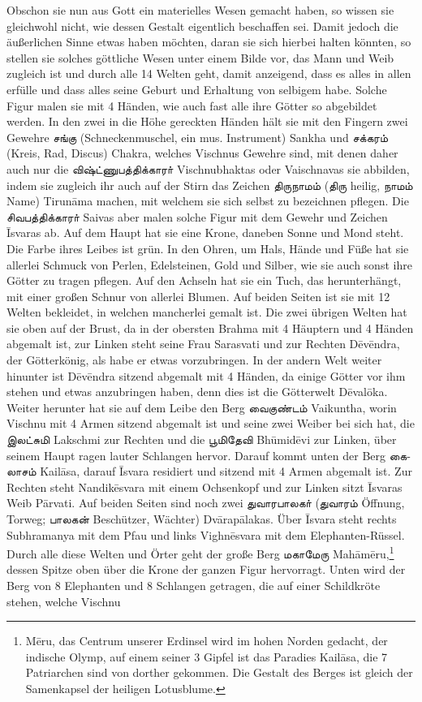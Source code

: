 \documentclass{article}
\newcommand{\TamilText}[1]{\texttamil{#1}}
\newcommand{\tam}[1]{\TamilText{#1}}
\begin{document}
Obschon sie nun aus Gott ein materielles Wesen gemacht haben, so wissen sie gleichwohl nicht, wie dessen Gestalt eigentlich beschaffen sei. Damit jedoch die äußerlichen Sinne etwas haben möchten, daran sie sich hierbei halten könnten, so stellen sie solches göttliche Wesen unter einem Bilde vor, das Mann und Weib zugleich ist und durch alle 14 Welten geht, damit anzeigend, dass es alles in allen erfülle und dass alles seine Geburt und Erhaltung von selbigem habe. Solche Figur malen sie mit 4 Händen, wie auch fast alle ihre Götter so abgebildet werden. In den zwei in die Höhe gereckten Händen hält sie mit den Fingern zwei Gewehre \tam{சங்கு} (Schneckenmuschel, ein mus. Instrument) Sankha und \tam{சக்கரம்} (Kreis, Rad, Discus) Chakra, welches Vischnus Gewehre sind, mit denen daher auch nur die \tam{விஷ்ட்ணுபத்திக்காரா்} Vischnubhaktas oder Vaischnavas sie abbilden, indem sie zugleich ihr auch auf der Stirn das Zeichen \tam{திருநாமம்} (\tam{திரு} heilig, \tam{நாமம்} Name) Tirun\={a}ma machen, mit welchem sie sich selbst zu bezeichnen pflegen. Die \tam{சிவபத்திக்காரா்} Saivas aber malen solche Figur mit dem Gewehr und Zeichen \={I}svaras ab. Auf dem Haupt hat sie eine Krone, daneben Sonne und Mond steht. Die Farbe ihres Leibes ist grün. In den Ohren, um Hals, Hände und Füße hat sie allerlei Schmuck von Perlen, Edelsteinen, Gold und Silber, wie sie auch sonst ihre Götter zu tragen pflegen. Auf den Achseln hat sie ein Tuch, das herunterhängt, mit einer großen Schnur von allerlei Blumen. Auf beiden Seiten ist sie mit 12 Welten bekleidet, in welchen mancherlei gemalt ist. Die zwei übrigen Welten hat sie oben auf der Brust, da in der obersten Brahma mit 4 Häuptern und 4 Händen abgemalt ist, zur Linken steht seine Frau Sarasvati und zur Rechten D\={e}v\={e}ndra, der Götterkönig, als habe er etwas vorzubringen. In der andern Welt weiter hinunter ist D\={e}v\={e}ndra sitzend abgemalt mit 4 Händen, da einige Götter vor ihm stehen und etwas anzubringen haben, denn dies ist die Götterwelt D\={e}val\={o}ka. Weiter herunter hat sie auf dem Leibe den Berg \tam{வைகுண்டம்} Vaikuntha, worin Vischnu mit 4 Armen sitzend abgemalt ist und seine zwei Weiber bei sich hat, die \tam{இலட்சுமி} Lakschmi zur Rechten und die \tam{பூமிதேவி} Bh\={u}mid\={e}vi zur Linken, über seinem Haupt ragen lauter Schlangen hervor. Darauf kommt unten der Berg \tam{கைலாசம்} Kail\={a}sa, darauf \={I}svara residiert und sitzend mit 4 Armen abgemalt ist. Zur Rechten steht Nandik\={e}svara mit einem Ochsenkopf und zur Linken sitzt \={I}svaras Weib P\={a}rvati. Auf beiden Seiten sind noch zwei \tam{துவாரபாலகா்} (\tam{துவாரம்} Öffnung, Torweg; \tam{பாலகன்} Beschützer, Wächter) Dv\={a}rap\={a}lakas. Über \={I}svara steht rechts Subhramanya mit dem Pfau und links Vighn\={e}svara mit dem Elephanten-Rüssel. Durch alle diese Welten und Örter geht der große Berg \tam{மகாமேரு} Mah\={a}m\={e}ru,\footnote{M\={e}ru, das Centrum unserer Erdinsel wird im hohen Norden gedacht, der indische Olymp, auf einem seiner 3 Gipfel ist das Paradies Kail\={a}sa, die 7 Patriarchen sind von dorther gekommen. Die Gestalt des Berges ist gleich der Samenkapsel der heiligen Lotusblume.} dessen Spitze oben über die Krone der ganzen Figur hervorragt. Unten wird der Berg von 8 Elephanten und 8 Schlangen getragen, die auf einer Schildkröte stehen, welche Vischnu 
\end{document}
